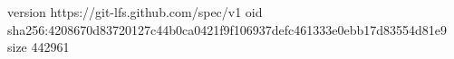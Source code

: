 version https://git-lfs.github.com/spec/v1
oid sha256:4208670d83720127c44b0ca0421f9f106937defc461333e0ebb17d83554d81e9
size 442961
